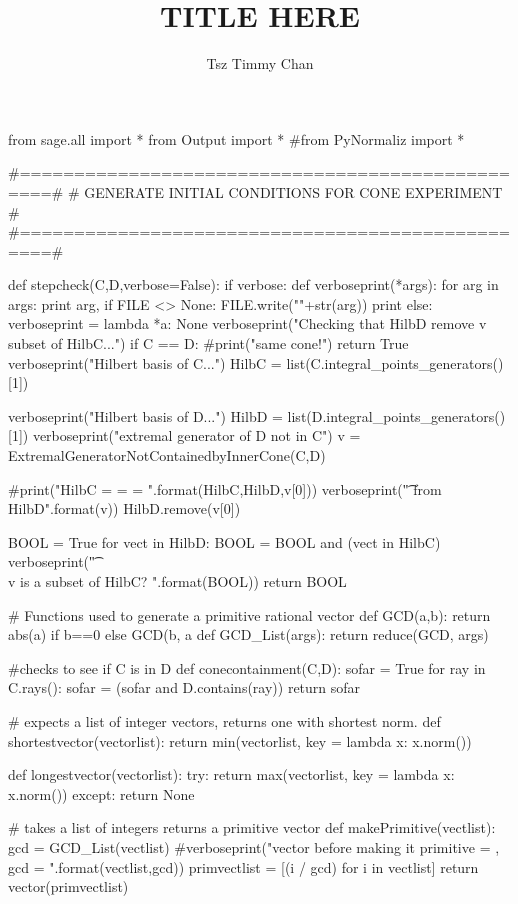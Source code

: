 \documentclass{TC}
\title{TITLE HERE}	%
\author{Tsz Timmy Chan}	%
\begin{document}
\begin{SAGE}
from sage.all import *
from Output import *
#from PyNormaliz import *

#=================================================#
# GENERATE INITIAL CONDITIONS FOR CONE EXPERIMENT #
#=================================================#

def stepcheck(C,D,verbose=False):
    if verbose:
        def verboseprint(*args):
            for arg in args:
                print arg,
                if FILE <> None:
                    FILE.write("\n"+str(arg))
            print
    else:
        verboseprint = lambda *a: None 
    verboseprint("Checking that HilbD remove v subset of HilbC...")
    if C == D:
        #print("same cone!")
        return True
    verboseprint("\tComputing Hilbert basis of C...")
    HilbC = list(C.integral_points_generators()[1])

    verboseprint("\tComputing Hilbert basis of D...")
    HilbD = list(D.integral_points_generators()[1])
    verboseprint("\tFinding extremal generator of D not in C")
    v = ExtremalGeneratorNotContainedbyInnerCone(C,D)
    
    #print("HilbC = \n{}\nHilbD = \n{}\nv = {} ".format(HilbC,HilbD,v[0]))
    verboseprint("\t\tRemoving {} from HilbD".format(v))
    HilbD.remove(v[0])

    BOOL = True
    for vect in HilbD:
        BOOL = BOOL and (vect in HilbC) 
    verboseprint("\t\tHilbD \\ v  is a subset of HilbC? {}".format(BOOL))
    return BOOL

# Functions used to generate a primitive rational vector
def GCD(a,b):
    return abs(a) if b==0 else GCD(b, a%
def GCD_List(args):
    return reduce(GCD, args)

#checks to see if C is in D
def conecontainment(C,D):
    sofar = True
    for ray in C.rays():
        sofar = (sofar and D.contains(ray))
    return sofar

# expects a list of integer vectors, returns one with shortest norm.
def shortestvector(vectorlist):
    return min(vectorlist, key = lambda x: x.norm())

def longestvector(vectorlist):
    try:
        return max(vectorlist, key = lambda x: x.norm()) 
    except:
        return None

      
# takes a list of integers returns a primitive vector 
def makePrimitive(vectlist):
    gcd = GCD_List(vectlist)
    #verboseprint("vector before making it primitive = {}, gcd = {}".format(vectlist,gcd))
    primvectlist = [(i / gcd) for i in vectlist] 
    return vector(primvectlist)


\end{SAGE}
\end{document}

